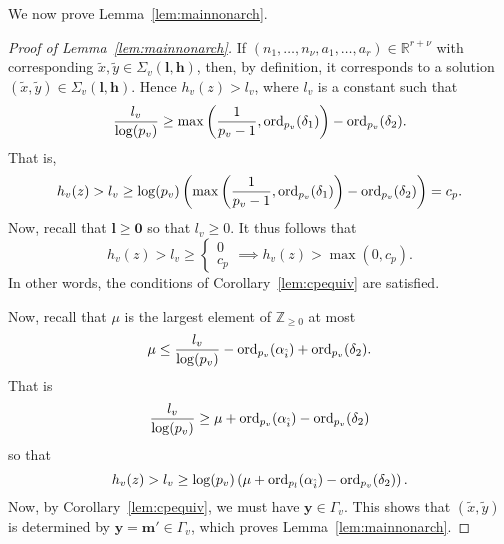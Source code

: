 We now prove Lemma~\ref{lem:mainnonarch}. 

\begin{proof}[Proof of Lemma~\ref{lem:mainnonarch}]
If $(n_1, \dots, n_{\nu}, a_1, \dots, a_r) \in \mathbb{R}^{r+\nu}$ with corresponding $\tilde{x}, \tilde{y} \in\Sigma_v(\mathbf{l},\mathbf{h})$, then, by definition, it corresponds to a solution $(\tilde{x},\tilde{y}) \in \Sigma_v(\mathbf{l},\mathbf{h})$. 
Hence $h_v(z)>l_v$, where $l_v$ is a constant such that
\[\frac{l_v}{\log(p_v)} \geq \max\left( \frac{1}{p_v-1}, \operatorname{ord}_{p_v}(\delta_1)\right) - \operatorname{ord}_{p_v}(\delta_2).\]
That is, 
\[h_v(z) > l_v \geq \log(p_v)\left(\max\left( \frac{1}{p_v-1}, \operatorname{ord}_{p_v}(\delta_1)\right) - \operatorname{ord}_{p_v}(\delta_2)\right) = c_p.\]
Now, recall that $\mathbf{l} \geq \mathbf{0}$ so that $l_v \geq 0$. It thus follows that 
\[h_v(z) > l_v \geq
\begin{cases}
0\\
c_p
\end{cases}
\implies h_v(z) >\max(0,c_p).\]
In other words, the conditions of Corollary~\ref{lem:cpequiv} are satisfied. 

Now, recall that $\mu$ is the largest element of $\mathbb{Z}_{\geq 0}$ at most
\[\mu \leq \frac{l_v}{\log(p_v)} - \operatorname{ord}_{p_v}(\alpha_{\hat{i}}) + \operatorname{ord}_{p_v}(\delta_2).\]
That is
\[\frac{l_v}{\log(p_v)} \geq \mu + \operatorname{ord}_{p_v}(\alpha_{\hat{i}}) - \operatorname{ord}_{p_v}(\delta_2)\]
so that
\[h_v(z) > l_v \geq \log(p_v)\left(\mu + \operatorname{ord}_{p_l}(\alpha_{\hat{i}}) - \operatorname{ord}_{p_v}(\delta_2)\right).\]
Now, by Corollary~\ref{lem:cpequiv}, we must have $\mathbf{y} \in \Gamma_v$. This shows that $(\tilde{x},\tilde{y})$ is determined by $\mathbf{y}=\mathbf{m}'\in\Gamma_v$, which proves Lemma~\ref{lem:mainnonarch}.
%
\end{proof}


